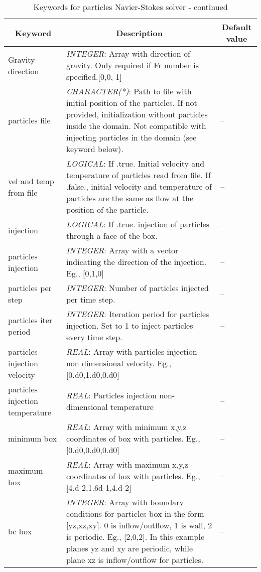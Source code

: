 \documentclass[a4paper,10pt]{report}
\begin{document}
    \begin{table}[htbp]
    \caption{Keywords for particles Navier-Stokes solver - continued}
    \begin{tabular}{|l|p{10cm}|p{2.2cm}|}
    \hline
    \multicolumn{1}{|c|}{Keyword} & \multicolumn{1}{c|}{Description} & \multicolumn{1}{c|}{Default value} \\ \hline

    Gravity direction                   & \textit{INTEGER}: Array with direction of gravity. Only required if Fr number is specified.[0,0,-1] & -- \\ \hline
    particles file                      & \textit{CHARACTER(*)}: Path to file with initial position of the particles. If not provided, initialization without particles inside the domain. Not compatible with injecting particles in the domain (see keyword below). & -- \\ \hline
    vel and temp from file              & \textit{LOGICAL}: If .true. Initial velocity and temperature of particles read from file. If .false., initial velocity and temperature of particles are the same as flow at the position of the particle. & -- \\ \hline
    injection                           & \textit{LOGICAL}: If .true. injection of particles through a face of the box. & -- \\ \hline
    particles injection                 & \textit{INTEGER}: Array with a vector indicating the direction of the injection. Eg., [0,1,0]      & -- \\ \hline
    particles per step                  & \textit{INTEGER}: Number of particles injected per time step. & -- \\ \hline
    particles iter period               & \textit{INTEGER}: Iteration period for particles injection. Set to 1 to inject particles every time step.   & -- \\ \hline
    particles injection velocity        & \textit{REAL}:   Array with particles injection non dimensional velocity. Eg., [0.d0,1.d0,0.d0] & -- \\ \hline
    particles injection temperature     & \textit{REAL}:  Particles injection non-dimensional temperature & -- \\ \hline
    minimum box                         & \textit{REAL}: Array with minimum x,y,z coordinates of box with particles. Eg., [0.d0,0.d0,0.d0]  & -- \\ \hline
    maximum box                         & \textit{REAL}: Array with maximum x,y,z coordinates of box with particles. Eg., [4.d-2,1.6d-1,4.d-2]  & -- \\ \hline
    bc box                              & \textit{INTEGER}: Array with boundary conditions for particles box in the form [yz,xz,xy]. 
    0 is inflow/outflow, 1 is wall, 2 is periodic. Eg.,   [2,0,2]. In this example planes yz and xy are periodic, while plane xz is inflow/outflow for particles. & -- \\ \hline

    \end{tabular}
    \label{tab:PartKey2}
    \end{table}
\end{document}
